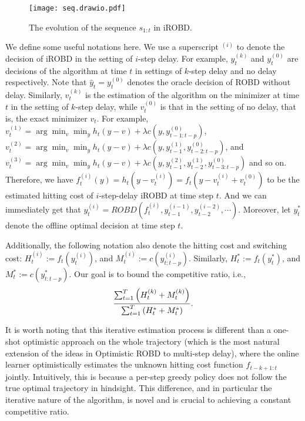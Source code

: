 \begin{figure}[ht!]
    \centering
    \texttt{[image: seq.drawio.pdf]}
    \caption{The evolution of the sequence $s_{1:t}$ in iROBD.}
    \label{fig:temp_seq}
\end{figure}
We define some useful notations here. We use a superscript $^{(i)}$ to denote the decision of iROBD in the setting of $i$-step delay. For example, $y_t^{(k)}$ and $y_t^{(0)}$ are decisions of the algorithm at time $t$ in settings of $k$-step delay and no delay respectively. Note that $\hat{y}_t=y_t^{(0)}$ denotes the oracle decision of ROBD without delay. Similarly, $v_t^{(k)}$ is the estimation of the algorithm on the minimizer at time $t$ in the setting of $k$-step delay, while $v_t^{(0)}$ is that in the setting of no delay, that is, the exact minimizer $v_t$. For example, ${v}_t^{(1)}=\arg\min_v\min_yh_t(y-v)+\lambda c(y,y_{t-1:t-p}^{(0)})$, ${v}_t^{(2)}=\arg\min_v\min_yh_t(y-v)+\lambda c(y,y_{t-1}^{(1)},y_{t-2:t-p}^{(0)})$, and ${v}_t^{(3)}=\arg\min_v\min_yh_t(y-v)+\lambda c(y,y_{t-1}^{(2)},y_{t-2}^{(1)},y_{t-3:t-p}^{(0)})$ and so on. Therefore, we have $f_t^{(i)}(y)=h_t(y-v_t^{(i)})=f_t(y-v_t^{(i)}+v_t^{(0)})$ to be the estimated hitting cost of $i$-step-delay iROBD at time step $t$. And we can immediately get that $y_t^{(i)}=ROBD(f_t^{(i)},y_{t-1}^{(i-1)},y_{t-2}^{(i-2)},\cdots)$. Moreover, let $y_t^*$ denote the offline optimal decision at time step $t$. 

Additionally, the following notation also denote the hitting cost and switching cost: $H_t^{(i)}:=f_t(y_t^{(i)})$, and $M_t^{(i)}:=c(y_{t:t-p}^{(i)})$. Similarly, $H_t^{*}:=f_t(y_t^{*})$, and $M_t^{*}:=c(y_{t:t-p}^{*})$. Our goal is to bound the competitive ratio, i.e.,
\begin{align}
    \frac{\sum_{t=1}^T\left(H_t^{(k)}+M_t^{(k)}\right)}{\sum_{t=1}^T\left(H_t^{*}+M_t^{*}\right)}.\notag
\end{align}

It is worth noting that this iterative estimation process is different than a one-shot optimistic approach on the whole trajectory (which is the most natural extension of the ideas in Optimistic ROBD to multi-step delay), where the online learner optimistically estimates the unknown hitting cost function $f_{t-k+1:t}$ jointly. Intuitively, this is because a per-step greedy policy does not follow the true optimal trajectory in hindsight. This difference, and in particular the iterative nature of the algorithm, is novel and is crucial to achieving a constant competitive ratio.

